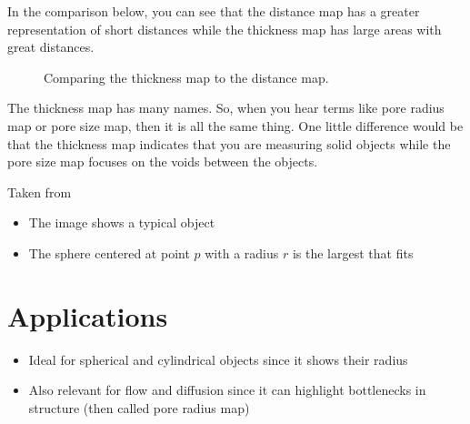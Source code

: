 \documentclass[letterpaper,10pt,english]{sphinxmanual}
\begin{document}
\sphinxAtStartPar
In the comparison below, you can see that the distance map has a greater representation of short distances while the thickness map has large areas with great distances.

\begin{figure}[htbp]
\centering
\capstart

\noindent{}
\caption{Comparing the thickness map to the distance map.}\label{\detokenize{06-AdvancedShapeAndTexture:id3}}\end{figure}

\sphinxAtStartPar
The thickness map has many names. So, when you hear terms like pore radius map or pore size map, then it is all the same thing. One little difference would be that the thickness map indicates that you are measuring solid objects while the pore size map focuses on the voids between the objects.



\sphinxAtStartPar
Taken from 
\begin{itemize}
\item {} 
\sphinxAtStartPar
The image shows a typical object

\item {} 
\sphinxAtStartPar
The sphere centered at point \(p\) with a radius \(r\) is the largest that fits

\end{itemize}


\section{Applications}
\label{\detokenize{06-AdvancedShapeAndTexture:applications}}\begin{itemize}
\item {} 
\sphinxAtStartPar
Ideal for spherical and cylindrical objects since it shows their radius

\item {} 
\sphinxAtStartPar
Also relevant for flow and diffusion since it can highlight bottlenecks in structure (then called pore radius map) 

\end{itemize}
\end{document}
